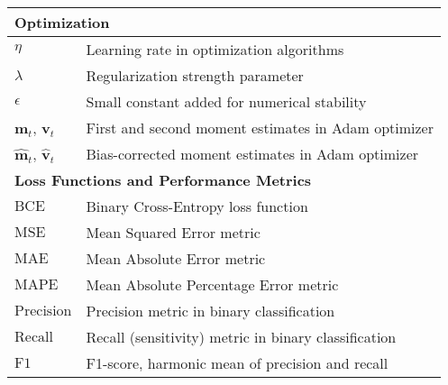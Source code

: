 \begin{appendices}
\begin{table}[htbp]
{\begin{tabular}{p{}p{}}
        \midrule
        \multicolumn{2}{l}{\textbf{Optimization}}                                                                                          \\
        \midrule
        $\eta$                                      & Learning rate in optimization algorithms                                             \\
        $\lambda$                                   & Regularization strength parameter                                                    \\
        $\epsilon$                                  & Small constant added for numerical stability                                         \\
        $\bm{m}_t$, $\bm{v}_t$                      & First and second moment estimates in Adam optimizer                                  \\
        $\hat{\bm{m}}_t$, $\hat{\bm{v}}_t$          & Bias-corrected moment estimates in Adam optimizer                                    \\
        \midrule
        \multicolumn{2}{l}{\textbf{Loss Functions and Performance Metrics}}                                                                \\
        \midrule
        $\text{BCE}$                                & Binary Cross-Entropy loss function                                                   \\
        $\text{MSE}$                                & Mean Squared Error metric                                                            \\
        $\text{MAE}$                                & Mean Absolute Error metric                                                           \\
        $\text{MAPE}$                               & Mean Absolute Percentage Error metric                                                \\
        $\text{Precision}$                          & Precision metric in binary classification                                            \\
        $\text{Recall}$                             & Recall (sensitivity) metric in binary classification                                 \\
        $\text{F1}$                                 & F1-score, harmonic mean of precision and recall                                      \\

\end{tabular}}
\end{table}
\end{appendices}

